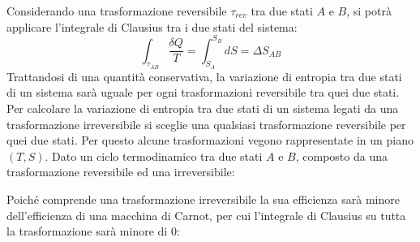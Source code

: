 \documentclass{article}
\numberwithin{equation}{subsection}
\begin{document}
Considerando una trasformazione reversibile $\tau_{rev}$ tra due stati $A$ e $B$, si potrà applicare 
l'integrale di Clausius tra i due stati del sistema:
\begin{equation}
    \int_{\tau_{AB}}\displaystyle\frac{\delta Q}{T}=\int_{S_A}^{S_B}dS=\Delta S_{AB}
\end{equation}
Trattandosi di una quantità conservativa, la variazione di entropia tra due stati di un sistema sarà uguale per ogni trasformazioni reversibile tra quei due stati. 
Per 
calcolare la variazione di entropia tra due stati di un sistema legati da una trasformazione irreversibile si sceglie una qualsiasi trasformazione reversibile per 
quei due stati.
Per questo alcune trasformazioni vegono rappresentate in un piano $(T,S)$. 
Dato un ciclo termodinamico tra due stati $A$ e $B$, composto da una trasformazione reversibile ed una irreversibile: 

\begin{center}\end{center}


Poiché comprende una trasformazione irreversibile la sua efficienza sarà minore dell'efficienza di una macchina di Carnot, per cui l'integrale di Clausius su tutta la trasformazione 
sarà minore di $0$:
\end{document}

